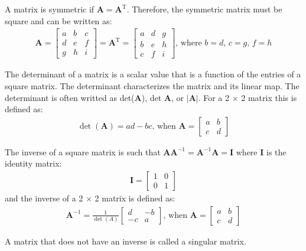 \documentclass[12pt,letter]{article}
\begin{document}
\begin{review}
	A matrix is symmetric if $\textbf{A} =\textbf{A}^\text{T}$. Therefore, the symmetric matrix must be square and can be written as:
	\begin{eqnarray}
	   \textbf{A} = \begin{bmatrix} a & b &c \\ d & e & f\\ g & h & i \end{bmatrix} = \textbf{A}^\text{T} = \begin{bmatrix} a & d & g \\ b & e & h \\ c & f & i \end{bmatrix}\text{, where } b=d \text{, }c=g\text{, }f=h
	\end{eqnarray}
	
	The determinant of a matrix is a scalar value that is a function of the entries of a square matrix. The determinant characterizes the matrix and its linear map. The determinant is often writted as det($\textbf{A}$), det $\textbf{A}$, or $|\textbf{A}|$. For a 2 $\times$ 2 matrix this is defined as:
	\begin{eqnarray}
	\det (\textbf{A}) = ad-bc  \text{, when } \textbf{A} = \begin{bmatrix} a & b \\ c & d \end{bmatrix}
	\end{eqnarray}
	
	The inverse of a square matrix is such that $\textbf{A}\textbf{A}^{-1} = \textbf{A}^{-1}\textbf{A}=\textbf{I}$ where $\textbf{I}$ is the identity matrix:
	\begin{eqnarray}
	\textbf{I} = \begin{bmatrix} 1 & 0 \\ 0 & 1 \end{bmatrix} 
	\end{eqnarray}
	and the inverse of a 2 $\times$ 2 matrix is defined as:
	\begin{eqnarray}
	\textbf{A}^{-1} = \frac{1}{\det (A)} \begin{bmatrix} d & -b \\ -c & a \end{bmatrix} \text{, when } \textbf{A} = \begin{bmatrix} a & b \\ c & d \end{bmatrix}
	\end{eqnarray}
	
	A matrix that does not have an inverse is called a singular matrix.
	
	
	\end{review}
			\vspace{-2ex}	
\end{document}
